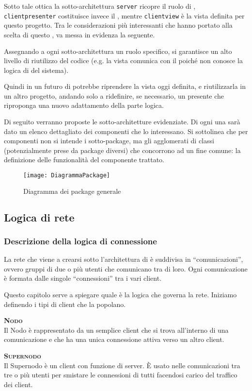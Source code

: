 Sotto tale ottica la sotto-architettura \texttt{server} ricopre il ruolo di , \texttt{clientpresenter} costituisce invece il , mentre \texttt{clientview} è la vista definita per questo progetto. Tra le considerazioni più interessanti che hanno portato alla scelta di questo , va messa in evidenza la seguente.

Assegnando a ogni sotto-architettura un ruolo specifico, si garantisce un alto livello di riutilizzo del codice (e.g. la vista comunica con il  poiché non conosce la logica di  del sistema).

Quindi in un futuro di potrebbe riprendere la vista oggi definita, e riutilizzarla in un altro progetto, andando solo a ridefinire, se necessario, un presente che riproponga una nuovo adattamento della parte logica.

Di seguito verranno proposte le sotto-architetture evidenziate. Di ogni una sarà dato un elenco dettagliato dei componenti che lo interessano. Si sottolinea che per componenti non si intende i sotto-package, ma gli agglomerati di classi (potenzialmente prese da package diversi) che concorrono ad un fine comune: la definizione delle funzionalità del componente trattato.

\begin{figure}[H]
\centering
  \texttt{[image: DiagrammaPackage]}
  \caption{Diagramma dei package generale}\label{fig:packagegenerale}
\end{figure}
\clearpage

\subsection{Logica di rete}

\subsubsection{Descrizione della logica di connessione}
La rete che viene a crearsi sotto l'architettura di \caName{} è suddivisa in ``comunicazioni'', ovvero gruppi di due o più utenti che comunicano tra di loro. Ogni comunicazione è formata dalle singole ``connessioni'' tra i vari client.

Questo capitolo serve a spiegare quale è la logica che governa la rete. Iniziamo definendo i tipi di client che la popolano.
\begin{description}
	\item{\scshape\bfseries Nodo}\\
	Il Nodo è rappresentato da un semplice client che si trova all'interno di una comunicazione e che ha una unica connessione attiva verso un altro client.
	\item{\scshape\bfseries Supernodo}\\
	Il Supernodo è un client con funzione di server. È usato nelle comunicazioni tra tre o più utenti per smistare le connessioni di tutti facendosi carico del traffico dei client.
\end{description}

